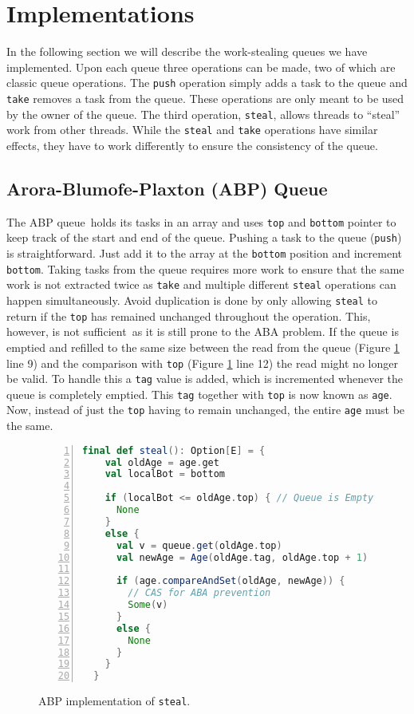 \section{Implementations}
\label{sec:implementations}
In the following section we will describe the work-stealing queues we have implemented. Upon each queue three operations can be made, two of which are classic queue operations. The \texttt{push} operation simply adds a task to the queue and \texttt{take} removes a task from the queue. These operations are only meant to be used by the owner of the queue. The third operation, \texttt{steal}, allows threads to ``steal'' work from other threads. While the \texttt{steal} and \texttt{take} operations have similar effects, they have to work differently to ensure the consistency of the queue.

\subsection{Arora-Blumofe-Plaxton (ABP) Queue}
The ABP queue\,\cite{Arora:1998:TSM:277651.277678} holds its tasks in an array and uses \texttt{top} and \texttt{bottom} pointer to keep track of the start and end of the queue. Pushing a task to the queue (\texttt{push}) is straightforward. Just add it to the array at the \texttt{bottom} position and increment \texttt{bottom}. Taking tasks from the queue requires more work to ensure that the same work is not extracted twice as \texttt{take} and multiple different \texttt{steal} operations can happen simultaneously. Avoid duplication is done by only allowing \texttt{steal} to return if the \texttt{top} has remained unchanged throughout the operation. This, however, is not sufficient\,\cite[p. 4]{Arora:1998:TSM:277651.277678} as it is still prone to the ABA problem. If the queue is emptied and refilled to the same size between the read from the queue (Figure \ref{fig:abpsteal} line 9) and the comparison with \texttt{top} (Figure \ref{fig:abpsteal} line 12) the read might no longer be valid. To handle this a \texttt{tag} value is added, which is incremented whenever the queue is completely emptied. This \texttt{tag} together with \texttt{top} is now known as \texttt{age}. Now, instead of just the \texttt{top} having to remain unchanged, the entire \texttt{age} must be the same.

\begin{figure}
\begin{lstlisting}[language=scala,basicstyle=\ttfamily\bfseries\scriptsize,numbers=left]
final def steal(): Option[E] = {
    val oldAge = age.get
    val localBot = bottom

    if (localBot <= oldAge.top) { // Queue is Empty
      None
    }
    else {
      val v = queue.get(oldAge.top)
      val newAge = Age(oldAge.tag, oldAge.top + 1)

      if (age.compareAndSet(oldAge, newAge)) { 
      	// CAS for ABA prevention
        Some(v)
      }
      else {
        None
      }
    }
  }
\end{lstlisting}
\caption{ABP implementation of \texttt{steal}.}
\label{fig:abpsteal}
\end{figure}

